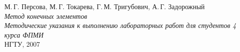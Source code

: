 \begin{thebibliography}{99}
	
 М.\,Г. Персова, М.\,Г. Токарева, Г.\,М. Тригубович, А.\,Г. Задорожный \\
	\textit{Метод конечных элементов \\ Методические указания к выполнению лабораторных работ для студентов 4 курса ФПМИ} \\
	НГТУ, 2007
\end{thebibliography} 